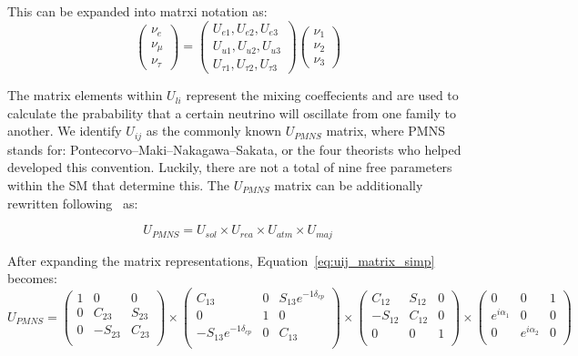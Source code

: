 This can be expanded into matrxi notation as:
\begin{equation}~\label{eq:mass_eigenstates}
\begin{pmatrix}
\nu_e\\
\nu_{\mu}\\
\nu_{\tau}
\end{pmatrix}
=
\begin{pmatrix}
U_{e1}, U_{e2}, U_{e3} \\
U_{u1}, U_{u2}, U_{u3} \\
U_{\tau1}, U_{\tau2}, U_{\tau3}
\end{pmatrix}
\begin{pmatrix}
\nu_1\\
\nu_2\\
\nu_3
\end{pmatrix}
\end{equation}

The matrix elements within $U_{li}$ represent the mixing coeffecients and are used to calculate the prabability that a certain neutrino will oscillate from one family to another.
We identify $U_{ij}$ as the commonly known $U_{PMNS}$ matrix, where PMNS stands for: Pontecorvo–Maki–Nakagawa–Sakata, or the four theorists who helped developed this convention.
Luckily, there are not a total of nine free parameters within the SM that determine this.
The $U_{PMNS}$ matrix can be additionally rewritten following~\citep{Pontecorvo:1957qd, 1962PThPh..28..870M} as:

\begin{equation}~\label{eq:uij_matrix_simp}
U_{PMNS}
=
U_{sol} \times U_{rea} \times U_{atm} \times U_{maj}
\end{equation}

After expanding the matrix representations, Equation~\ref{eq:uij_matrix_simp} becomes:
\begin{equation}
U_{PMNS}
=
\begin{pmatrix}
1 & 0 & 0 \\
0 & C_{23} & S_{23} \\
0 & -S_{23} & C_{23} \\
\end{pmatrix}
\times
\begin{pmatrix}
C_{13} & 0 & S_{13}e^{-1\delta_{cp}} \\
0 & 1 & 0 \\
-S_{13}e^{-1\delta_{cp}} & 0 & C_{13} \\
\end{pmatrix}
\times
\begin{pmatrix}
C_{12} & S_{12} & 0 \\
-S_{12} & C_{12} & 0 \\
0 & 0 & 1 \\
\end{pmatrix}
\times
\begin{pmatrix}
0 & 0 & 1 \\
e^{i\alpha_{1}} & 0 & 0 \\
0 & e^{i\alpha_{2}} & 0 \\
\end{pmatrix}
\end{equation}

